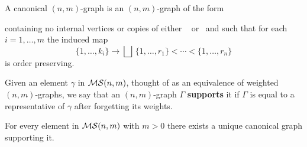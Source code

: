 \begin{definition} \label{definition: surjection-like element}
	A canonical $(n,m)$-graph is an $(n,m)$-graph of the form 
	\begin{center}
	\end{center}
	containing no internal vertices or copies of either\, \counit\ \,or \involution\ and such that for each $i = 1, \dots, m$ the induced map 
	\begin{equation*}
	\{1,\dots,k_i\} \to \bigsqcup\, \{1,\dots,r_1\} <  \cdots < \{1,\dots,r_n\}
	\end{equation*}
	is order preserving.
\end{definition}

\begin{definition}
	Given an element $\gamma$ in $\mathcal{MS}(n,m)$, thought of as an equivalence of weighted $(n,m)$-graphs, we say that an $(n,m)$-graph $\Gamma$ \textbf{supports} it if $\Gamma$ is equal to a representative of $\gamma$ after forgetting its weights.
\end{definition}

\begin{lemma} \label{lemma: unique surjection-like representative}
	For every element in $\mathcal{MS}(n,m)$ with $m>0$ there exists a unique canonical graph supporting it.
\end{lemma}


